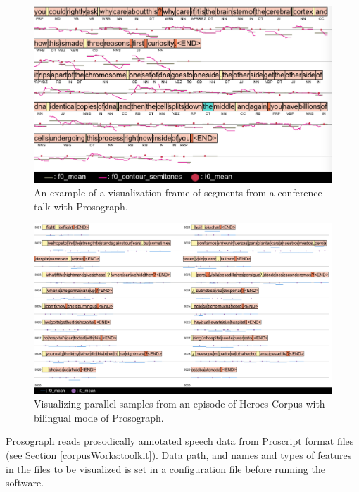 \begin{figure}
\centering\includegraphics[width=\linewidth]{img/prosograph_dump_2.png}
\caption{An example of a visualization frame of segments from a conference talk with Prosograph.}
\label{corpus:figure:prosograph_dump}
\end{figure}

\begin{figure}
\centering\includegraphics[width=\linewidth]{img/prosograph2_dump.png}
\caption{Visualizing parallel samples from an episode of Heroes Corpus with bilingual mode of Prosograph.}
\label{corpus:figure:prosograph2_dump}
\end{figure}

Prosograph reads prosodically annotated speech data from Proscript format files (see Section \ref{corpusWorks:toolkit}). Data path, and names and types of features in the files to be visualized is set in a configuration file before running the software. 

